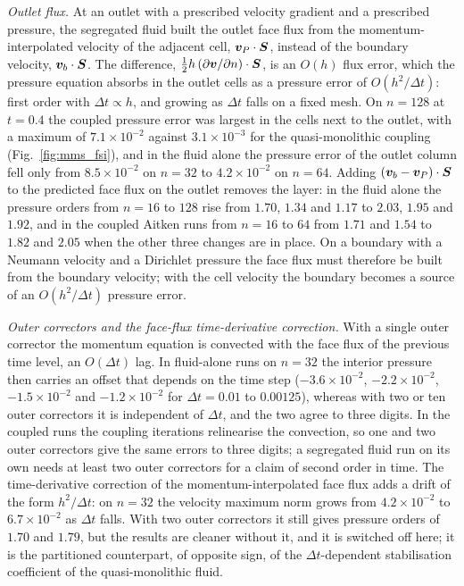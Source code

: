\emph{Outlet flux.}
At an outlet with a prescribed velocity gradient and a prescribed pressure, the segregated fluid built the outlet face flux from the momentum-interpolated velocity of the adjacent cell, $\boldsymbol{v}_P\cdot\boldsymbol{S}$, instead of the boundary velocity, $\boldsymbol{v}_b\cdot\boldsymbol{S}$.
The difference, $\tfrac{1}{2}h\,(\partial\boldsymbol{v}/\partial n)\cdot\boldsymbol{S}$, is an $O(h)$ flux error, which the pressure equation absorbs in the outlet cells as a pressure error of $O(h^2/\Delta t)$: first order with $\Delta t \propto h$, and growing as $\Delta t$ falls on a fixed mesh.
On $n = 128$ at $t = 0.4$ the coupled pressure error was largest in the cells next to the outlet, with a maximum of $7.1\times10^{-2}$ against $3.1\times10^{-3}$ for the quasi-monolithic coupling (Fig.~\ref{fig:mms_fsi}), and in the fluid alone the pressure error of the outlet column fell only from $8.5\times10^{-2}$ on $n = 32$ to $4.2\times10^{-2}$ on $n = 64$.
Adding $(\boldsymbol{v}_b - \boldsymbol{v}_P)\cdot\boldsymbol{S}$ to the predicted face flux on the outlet removes the layer: in the fluid alone the pressure orders from $n = 16$ to $128$ rise from $1.70$, $1.34$ and $1.17$ to $2.03$, $1.95$ and $1.92$, and in the coupled Aitken runs from $n = 16$ to $64$ from $1.71$ and $1.54$ to $1.82$ and $2.05$ when the other three changes are in place.
On a boundary with a Neumann velocity and a Dirichlet pressure the face flux must therefore be built from the boundary velocity; with the cell velocity the boundary becomes a source of an $O(h^2/\Delta t)$ pressure error.

\emph{Outer correctors and the face-flux time-derivative correction.}
With a single outer corrector the momentum equation is convected with the face flux of the previous time level, an $O(\Delta t)$ lag.
In fluid-alone runs on $n = 32$ the interior pressure then carries an offset that depends on the time step ($-3.6\times10^{-2}$, $-2.2\times10^{-2}$, $-1.5\times10^{-2}$ and $-1.2\times10^{-2}$ for $\Delta t = 0.01$ to $0.00125$), whereas with two or ten outer correctors it is independent of $\Delta t$, and the two agree to three digits.
In the coupled runs the coupling iterations relinearise the convection, so one and two outer correctors give the same errors to three digits; a segregated fluid run on its own needs at least two outer correctors for a claim of second order in time.
The time-derivative correction of the momentum-interpolated face flux adds a drift of the form $h^2/\Delta t$: on $n = 32$ the velocity maximum norm grows from $4.2\times10^{-2}$ to $6.7\times10^{-2}$ as $\Delta t$ falls.
With two outer correctors it still gives pressure orders of $1.70$ and $1.79$, but the results are cleaner without it, and it is switched off here; it is the partitioned counterpart, of opposite sign, of the $\Delta t$-dependent stabilisation coefficient of the quasi-monolithic fluid.

